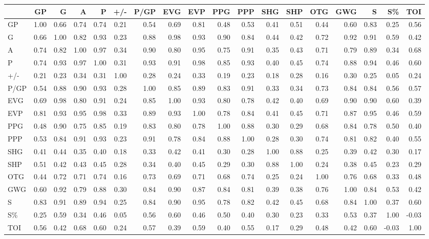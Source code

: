 \begin{tabular}{lrrrrrrrrrrrrrrrrr}
\toprule
 & GP & G & A & P & +/- & P/GP & EVG & EVP & PPG & PPP & SHG & SHP & OTG & GWG & S & S\% & TOI \\
\midrule
GP & 1.00 & 0.66 & 0.74 & 0.74 & 0.21 & 0.54 & 0.69 & 0.81 & 0.48 & 0.53 & 0.41 & 0.51 & 0.44 & 0.60 & 0.83 & 0.25 & 0.56 \\
G & 0.66 & 1.00 & 0.82 & 0.93 & 0.23 & 0.88 & 0.98 & 0.93 & 0.90 & 0.84 & 0.44 & 0.42 & 0.72 & 0.92 & 0.91 & 0.59 & 0.42 \\
A & 0.74 & 0.82 & 1.00 & 0.97 & 0.34 & 0.90 & 0.80 & 0.95 & 0.75 & 0.91 & 0.35 & 0.43 & 0.71 & 0.79 & 0.89 & 0.34 & 0.68 \\
P & 0.74 & 0.93 & 0.97 & 1.00 & 0.31 & 0.93 & 0.91 & 0.98 & 0.85 & 0.93 & 0.40 & 0.45 & 0.74 & 0.88 & 0.94 & 0.46 & 0.60 \\
+/- & 0.21 & 0.23 & 0.34 & 0.31 & 1.00 & 0.28 & 0.24 & 0.33 & 0.19 & 0.23 & 0.18 & 0.28 & 0.16 & 0.30 & 0.25 & 0.05 & 0.24 \\
P/GP & 0.54 & 0.88 & 0.90 & 0.93 & 0.28 & 1.00 & 0.85 & 0.89 & 0.83 & 0.91 & 0.33 & 0.34 & 0.73 & 0.84 & 0.84 & 0.56 & 0.57 \\
EVG & 0.69 & 0.98 & 0.80 & 0.91 & 0.24 & 0.85 & 1.00 & 0.93 & 0.80 & 0.78 & 0.42 & 0.40 & 0.69 & 0.90 & 0.90 & 0.60 & 0.39 \\
EVP & 0.81 & 0.93 & 0.95 & 0.98 & 0.33 & 0.89 & 0.93 & 1.00 & 0.78 & 0.84 & 0.41 & 0.45 & 0.71 & 0.87 & 0.95 & 0.46 & 0.59 \\
PPG & 0.48 & 0.90 & 0.75 & 0.85 & 0.19 & 0.83 & 0.80 & 0.78 & 1.00 & 0.88 & 0.30 & 0.29 & 0.68 & 0.84 & 0.78 & 0.50 & 0.40 \\
PPP & 0.53 & 0.84 & 0.91 & 0.93 & 0.23 & 0.91 & 0.78 & 0.84 & 0.88 & 1.00 & 0.28 & 0.30 & 0.74 & 0.81 & 0.82 & 0.40 & 0.55 \\
SHG & 0.41 & 0.44 & 0.35 & 0.40 & 0.18 & 0.33 & 0.42 & 0.41 & 0.30 & 0.28 & 1.00 & 0.88 & 0.25 & 0.39 & 0.42 & 0.30 & 0.17 \\
SHP & 0.51 & 0.42 & 0.43 & 0.45 & 0.28 & 0.34 & 0.40 & 0.45 & 0.29 & 0.30 & 0.88 & 1.00 & 0.24 & 0.38 & 0.45 & 0.23 & 0.29 \\
OTG & 0.44 & 0.72 & 0.71 & 0.74 & 0.16 & 0.73 & 0.69 & 0.71 & 0.68 & 0.74 & 0.25 & 0.24 & 1.00 & 0.76 & 0.68 & 0.33 & 0.48 \\
GWG & 0.60 & 0.92 & 0.79 & 0.88 & 0.30 & 0.84 & 0.90 & 0.87 & 0.84 & 0.81 & 0.39 & 0.38 & 0.76 & 1.00 & 0.84 & 0.53 & 0.42 \\
S & 0.83 & 0.91 & 0.89 & 0.94 & 0.25 & 0.84 & 0.90 & 0.95 & 0.78 & 0.82 & 0.42 & 0.45 & 0.68 & 0.84 & 1.00 & 0.37 & 0.60 \\
S\% & 0.25 & 0.59 & 0.34 & 0.46 & 0.05 & 0.56 & 0.60 & 0.46 & 0.50 & 0.40 & 0.30 & 0.23 & 0.33 & 0.53 & 0.37 & 1.00 & -0.03 \\
TOI & 0.56 & 0.42 & 0.68 & 0.60 & 0.24 & 0.57 & 0.39 & 0.59 & 0.40 & 0.55 & 0.17 & 0.29 & 0.48 & 0.42 & 0.60 & -0.03 & 1.00 \\
\bottomrule
\end{tabular}
